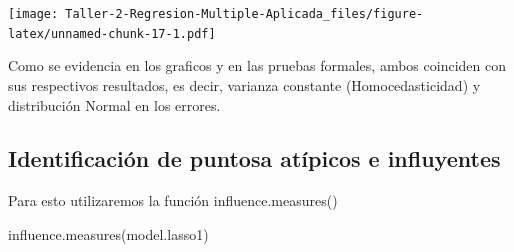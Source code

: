 \documentclass[
]{article}
\newenvironment{Shaded}{\begin{snugshade}}{\end{snugshade}}
\newcommand{\FunctionTok}[1]{\textcolor[rgb]{0.00,0.00,0.00}{#1}}
\newcommand{\NormalTok}[1]{#1}
\begin{document}
\texttt{[image: Taller-2-Regresion-Multiple-Aplicada\_files/figure-latex/unnamed-chunk-17-1.pdf]}

Como se evidencia en los graficos y en las pruebas formales, ambos
coinciden con sus respectivos resultados, es decir, varianza constante
(Homocedasticidad) y distribución Normal en los errores.

\hypertarget{identificaciuxf3n-de-puntosa-atuxedpicos-e-influyentes}{%
\subsection{Identificación de puntosa atípicos e
influyentes}\label{identificaciuxf3n-de-puntosa-atuxedpicos-e-influyentes}}

Para esto utilizaremos la función influence.measures()

\begin{Shaded}
\begin{Highlighting}[]
\FunctionTok{influence.measures}\NormalTok{(model.lasso1)}
\end{Highlighting}
\end{Shaded}
\end{document}
